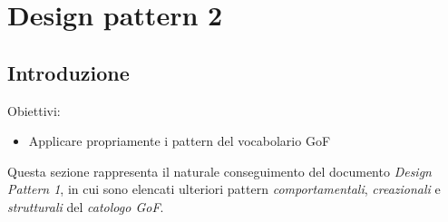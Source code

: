 \documentclass{article}
\begin{document}
\pagestyle{empty}
\section*{Design pattern 2}
\large

\subsection*{Introduzione}
\large
Obiettivi:
\begin{itemize}
    \renewcommand{\labelitemi}{-}
    \itemsep0em
    \item Applicare propriamente i pattern del vocabolario GoF 
\end{itemize}
Questa sezione rappresenta il naturale conseguimento del documento \textit{Design Pattern 1}, in cui sono elencati ulteriori pattern \textit{comportamentali}, \textit{creazionali} e \textit{strutturali} del \textit{catologo GoF}.
\end{document}
